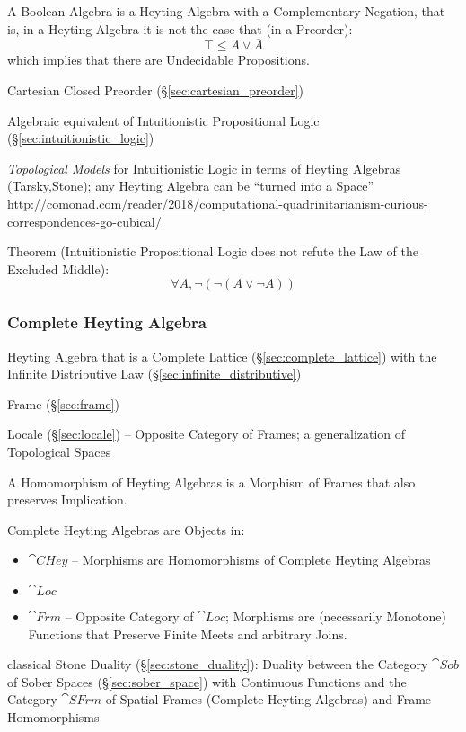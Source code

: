 A Boolean Algebra is a Heyting Algebra with a Complementary Negation,
that is, in a Heyting Algebra it is not the case that (in a Preorder):
\[
  \top \leq A \vee \overline{A}
\]
which implies that there are Undecidable Propositions.

Cartesian Closed Preorder (\S\ref{sec:cartesian_preorder})

Algebraic equivalent of Intuitionistic Propositional Logic
(\S\ref{sec:intuitionistic_logic})

\emph{Topological Models} for Intuitionistic Logic in terms of Heyting Algebras
(Tarsky,Stone); any Heyting Algebra can be ``turned into a Space''
\url{http://comonad.com/reader/2018/computational-quadrinitarianism-curious-correspondences-go-cubical/}

Theorem (Intuitionistic Propositional Logic does not refute the Law of
the Excluded Middle)\cite{harper12}:
\[
  \forall A, \neg (\neg (A \vee \neg A))
\]



\subsubsection{Complete Heyting Algebra}\label{sec:complete_heyting}

Heyting Algebra that is a Complete Lattice
(\S\ref{sec:complete_lattice}) with the Infinite Distributive Law
(\S\ref{sec:infinite_distributive})

Frame (\S\ref{sec:frame})

Locale (\S\ref{sec:locale}) -- Opposite Category of Frames; a generalization of
Topological Spaces

A Homomorphism of Heyting Algebras is a Morphism of Frames that also
preserves Implication.

Complete Heyting Algebras are Objects in:
\begin{itemize}
  \item $\cat{CHey}$ -- Morphisms are Homomorphisms of Complete
    Heyting Algebras
  \item $\cat{Loc}$
  \item $\cat{Frm}$ -- Opposite Category of $\cat{Loc}$; Morphisms are
    (necessarily Monotone) Functions that Preserve Finite Meets and
    arbitrary Joins.
\end{itemize}

classical Stone Duality (\S\ref{sec:stone_duality}): Duality between the
Category $\cat{Sob}$ of Sober Spaces (\S\ref{sec:sober_space}) with Continuous
Functions and the Category $\cat{SFrm}$ of Spatial Frames (Complete Heyting
Algebras) and Frame Homomorphisms




